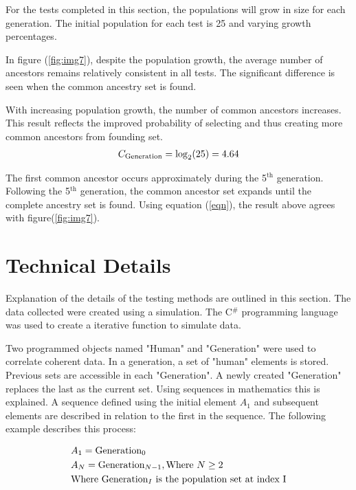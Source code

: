 \documentclass[12pt]{extarticle}
\begin{document}
For the tests completed in this section, the populations will grow in size for each generation. The initial population for each test is 25 and varying growth percentages.

In figure (\ref{fig:img7}), despite the population growth, the average number of ancestors remains relatively consistent in all tests. The significant difference is seen when the common ancestry set is found. 

With increasing population growth, the number of common ancestors increases. This result reflects the improved probability of selecting and thus creating more common ancestors from founding set. 
\begin{align}
\notag
C_{\text{Generation}} = \log_2(25) = 4.64
\end{align}


The first common ancestor occurs approximately during the 5$^{\text{th}}$ generation. Following the 5$^{\text{th}}$ generation, the common ancestor set expands until the complete ancestry set is found. Using equation (\ref{eqn}), the result above agrees with figure(\ref{fig:img7}).

\section{Technical Details}

Explanation of the details of the testing methods are outlined in this section. The data collected were created using a simulation. The C$^\#$ programming language was used to create a iterative function to simulate data.

Two programmed objects named "Human" and "Generation" were used to correlate coherent data. In a generation, a set of "human" elements is stored. Previous sets are accessible in each "Generation". A newly created "Generation" replaces the last as the current set. Using sequences in mathematics this is explained. A sequence defined using the initial element $A_1$ and subsequent elements are described in relation to the first in the sequence. The following example describes this process:

\begin{align}
\notag
& A_1 = \text{Generation}_0 \\
\notag
& A_N =\text{Generation}_{N-1}, \text{Where } N \geq 2 \\
\notag
&\text{Where Generation}_I \text{ is the population set at index I} 
\end{align}
\end{document}
